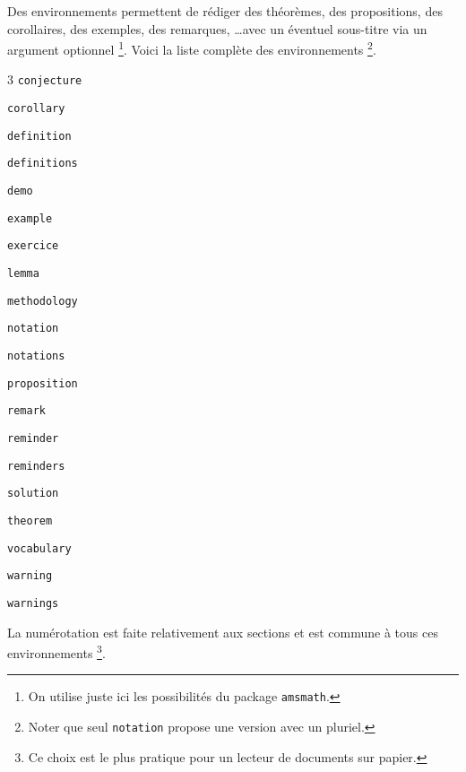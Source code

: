 Des environnements permettent de rédiger des théorèmes, des propositions, des corollaires, des exemples, des remarques, \dots avec un éventuel sous-titre via un argument optionnel
\footnote{
	On utilise juste ici les possibilités du package \texttt{amsmath}.
}. Voici la liste complète des environnements
\footnote{
	Noter que seul \texttt{notation} propose une version avec un pluriel.
}.

\begin{multicols-sep}{3}
	\verb+conjecture+

	\verb+corollary+

	\verb+definition+

	\verb+definitions+

	\verb+demo+

	\verb+example+

	\verb+exercice+
	
	\verb+lemma+

	\verb+methodology+

	\verb+notation+
	
	\verb+notations+

	\verb+proposition+

	\verb+remark+

	\verb+reminder+

	\verb+reminders+

	\verb+solution+

	\verb+theorem+

	\verb+vocabulary+

	\verb+warning+

	\verb+warnings+
	
\end{multicols-sep}


\medskip


La numérotation est faite relativement aux sections et est commune à tous ces environnements
\footnote{
	Ce choix est le plus pratique pour un lecteur de documents sur papier.
}.
